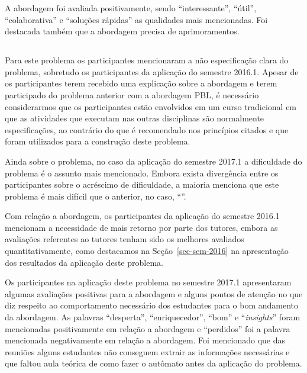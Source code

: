 A abordagem foi avaliada positivamente, sendo
``interessante'', ``útil'', ``colaborativa'' e ``soluções rápidas''
as qualidades mais mencionadas.
Foi destacada também que a abordagem precisa de
aprimoramentos.

\subsection{\ProblemaB}

Para este problema os participantes mencionaram a não especificação clara
do problema, sobretudo os participantes da aplicação do semestre 2016.1.
Apesar de os participantes terem recebido
uma explicação sobre a abordagem e terem participado
do problema anterior com a abordagem \ac{PBL}, é necessário considerarmos
que os participantes estão envolvidos em um curso tradicional
em que as atividades que executam nas outras disciplinas são normalmente
especificações, ao contrário do que é recomendado nos princípios
citados  e que foram utilizados para
a construção deste problema.

Ainda sobre o problema, no caso da aplicação do semestre 2017.1 a dificuldade
do problema é o assunto mais mencionado.
Embora exista divergência entre os participantes
sobre o acréscimo de dificuldade, a maioria menciona que este
problema é mais difícil que o anterior, no caso, ``\ProblemaG''.

Com relação a abordagem, os participantes da aplicação do semestre 2016.1
mencionam a necessidade de mais retorno por parte dos tutores,
embora as avaliações referentes ao tutores tenham sido
os melhores avaliados quantitativamente, como destacamos
na Seção~\ref{sec-sem-2016} na apresentação dos resultados
da aplicação deste problema.

Os participantes na aplicação deste problema no semestre 2017.1
apresentaram algumas avaliações positivas para a abordagem
e alguns pontos de atenção no que diz respeito ao
comportamento necessário dos estudantes para o bom
andamento da abordagem.
As palavras ``desperta'', ``enriquecedor'', ``bom'' e ``\textit{insights}''
foram mencionadas positivamente em relação a abordagem e ``perdidos''
foi a palavra mencionada negativamente em relação a abordagem.
Foi mencionado que das reuniões alguns estudantes não conseguem
extrair as informações necessárias e que faltou aula teórica
de como fazer o autômato antes da aplicação do problema.

